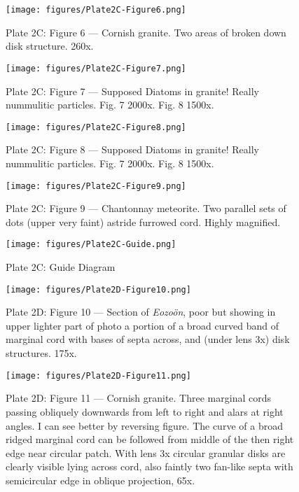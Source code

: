 \documentclass[a4paper, 12pt, oneside]{article}
\begin{document}
\begin{figure}[b]
\centering
\texttt{[image: figures/Plate2C-Figure6.png]}
\caption{\small Plate 2C: Figure 6 --- Cornish granite. Two areas of broken down disk structure. 260x.}
\end{figure}
\clearpage
\begin{figure}[b]
\centering
\texttt{[image: figures/Plate2C-Figure7.png]}
\caption{\small Plate 2C: Figure 7 --- Supposed Diatoms in granite! Really nummulitic particles. Fig. 7 2000x. Fig. 8 1500x.}
\end{figure}
\clearpage
\begin{figure}[b]
\centering
\texttt{[image: figures/Plate2C-Figure8.png]}
\caption{\small Plate 2C: Figure 8 --- Supposed Diatoms in granite! Really nummulitic particles. Fig. 7 2000x. Fig. 8 1500x.}
\end{figure}
\clearpage
\begin{figure}[b]
\centering
\texttt{[image: figures/Plate2C-Figure9.png]}
\caption{\small Plate 2C: Figure 9 --- Chantonnay meteorite. Two parallel sets of dots (upper very faint) astride furrowed cord. Highly magnified.}
\end{figure}
\clearpage
\begin{figure}[b]
\centering
\texttt{[image: figures/Plate2C-Guide.png]}
\caption{\small Plate 2C: Guide Diagram}
\end{figure}
\clearpage
{}
\cfoot{\thepage}
\begin{figure}[b]
\centering
\texttt{[image: figures/Plate2D-Figure10.png]}
\caption{\small Plate 2D: Figure 10 --- Section of \emph{Eozoön}, poor but showing in upper lighter part of photo a portion of a broad curved band of marginal cord with bases of septa across, and (under lens 3x) disk structures. 175x.}
\end{figure}
\clearpage
\begin{figure}[b]
\centering
\texttt{[image: figures/Plate2D-Figure11.png]}
\caption{\small Plate 2D: Figure 11 --- Cornish granite. Three marginal cords passing obliquely downwards from left to right and alars at right angles. I can see better by reversing figure. The curve of a broad ridged marginal cord can be followed from middle of the then right edge near circular patch. With lens 3x circular granular disks are clearly visible lying across cord, also faintly two fan-like septa with semicircular edge in oblique projection, 65x.}
\end{figure}
\end{document}
